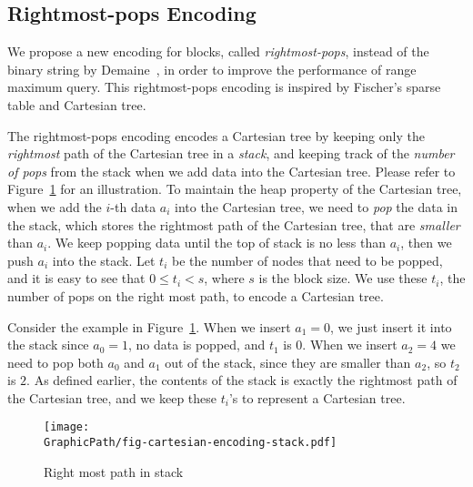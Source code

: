 
\subsection{Rightmost-pops Encoding} \label{sec:cct}

We propose a new encoding for blocks, called {\em rightmost-pops},
instead of the binary string by Demaine~\cite{Demaine2009OnCT}, in
order to improve the performance of range maximum query.  This
rightmost-pops encoding is inspired by Fischer's sparse table and
Cartesian tree.

The rightmost-pops encoding encodes a Cartesian tree by keeping only
the {\em rightmost} path of the Cartesian tree in a {\em stack}, and
keeping track of the {\em number of pops} from the stack when we add
data into the Cartesian tree.  Please refer to
Figure~\ref{fig:interval-cartesian} for an illustration.  To maintain
the heap property of the Cartesian tree, when we add the $i$-th data
$a_i$ into the Cartesian tree, we need to {\em pop} the data in the
stack, which stores the rightmost path of the Cartesian tree, that are
{\em smaller} than $a_i$.  We keep popping data until the top of stack
is no less than $a_i$, then we push $a_i$ into the stack.  Let $t_i$
be the number of nodes that need to be popped, and it is easy to see
that $0 \le t_i < s$, where $s$ is the block size.  We use these
$t_i$, the number of pops on the right most path, to encode a
Cartesian tree.

Consider the example in Figure~\ref{fig:interval-cartesian}.  When we
insert $a_1 = 0$, we just insert it into the stack since $a_0 = 1$, no
data is popped, and $t_1$ is $0$.  When we insert $a_2 = 4$ we need to
pop both $a_0$ and $a_1$ out of the stack, since they are smaller than
$a_2$, so $t_2$ is $2$.  As defined earlier, the contents of the stack
is exactly the rightmost path of the Cartesian tree, and we keep these
$t_i$'s to represent a Cartesian tree.

\begin{figure}[!thb]
  \centering
  \texttt{[image: \\GraphicPath/fig-cartesian-encoding-stack.pdf]}
  \caption{Right most path in stack}
  \label{fig:interval-cartesian}
\end{figure}



